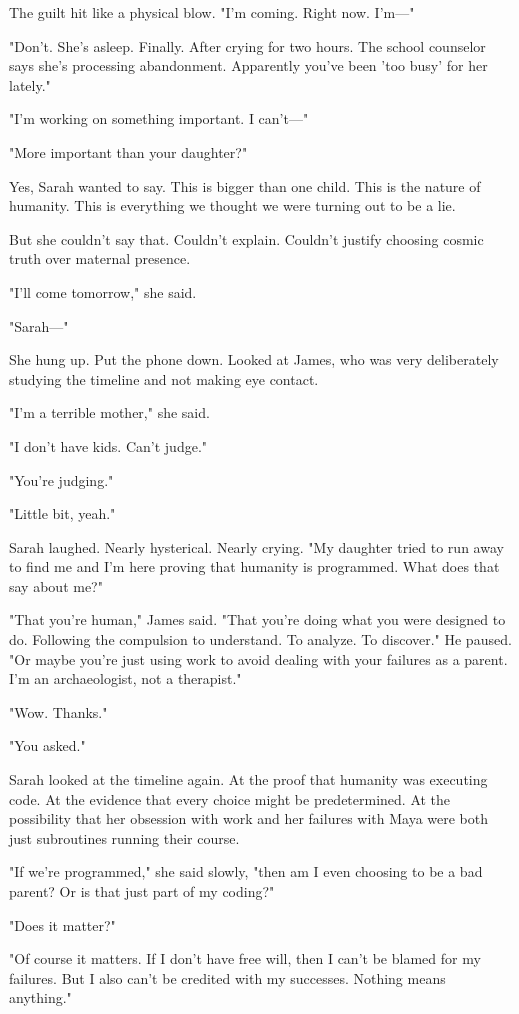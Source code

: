 The guilt hit like a physical blow. "I'm coming. Right now. I'm—"

"Don't. She's asleep. Finally. After crying for two hours. The school counselor says she's processing abandonment. Apparently you've been 'too busy' for her lately."

"I'm working on something important. I can't—"

"More important than your daughter?"

Yes, Sarah wanted to say. This is bigger than one child. This is the nature of humanity. This is everything we thought we were turning out to be a lie.

But she couldn't say that. Couldn't explain. Couldn't justify choosing cosmic truth over maternal presence.

"I'll come tomorrow," she said.

"Sarah—"

She hung up. Put the phone down. Looked at James, who was very deliberately studying the timeline and not making eye contact.

"I'm a terrible mother," she said.

"I don't have kids. Can't judge."

"You're judging."

"Little bit, yeah."

Sarah laughed. Nearly hysterical. Nearly crying. "My daughter tried to run away to find me and I'm here proving that humanity is programmed. What does that say about me?"

"That you're human," James said. "That you're doing what you were designed to do. Following the compulsion to understand. To analyze. To discover." He paused. "Or maybe you're just using work to avoid dealing with your failures as a parent. I'm an archaeologist, not a therapist."

"Wow. Thanks."

"You asked."

Sarah looked at the timeline again. At the proof that humanity was executing code. At the evidence that every choice might be predetermined. At the possibility that her obsession with work and her failures with Maya were both just subroutines running their course.

"If we're programmed," she said slowly, "then am I even choosing to be a bad parent? Or is that just part of my coding?"

"Does it matter?"

"Of course it matters. If I don't have free will, then I can't be blamed for my failures. But I also can't be credited with my successes. Nothing means anything."

